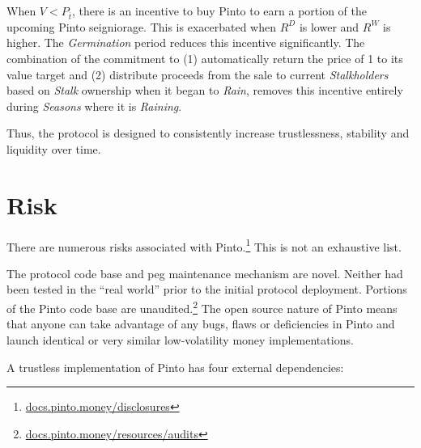 \documentclass[tikz]{article}
\newcommand{\term}[1]{\textsl{#1}}
\newcommand{\fref}[1]{\footnote{\href{http://#1}{#1}}}
\newcommand{\Pinto}{} %
\begin{document}
When $V < P_{\overline{t}}$, there is an incentive to buy Pinto to earn a portion of the upcoming Pinto seigniorage. This is exacerbated when $R^{D}$ is lower and $R^{W}$ is higher. The \term{Germination} period reduces this incentive significantly. The combination of the commitment to (1) automatically return the price of \Pinto1 to its value target and (2) distribute proceeds from the sale to current \term{Stalkholders} based on \term{Stalk} ownership when it began to \term{Rain}, removes this incentive entirely during \term{Seasons} where it is \term{Raining}.

\vspace{-0.15cm}

Thus, the protocol is designed to consistently increase trustlessness, stability and liquidity over time.


\vspace{-0.15cm}
\section{Risk}
\vspace{-0.15cm}

There are numerous risks associated with Pinto.\fref{docs.pinto.money/disclosures} This is not an exhaustive list.

\vspace{-0.15cm}

The protocol code base and peg maintenance mechanism are novel. Neither had been tested in the “real world” prior to the initial protocol deployment. Portions of the Pinto code base are unaudited.\footnote{\href{https://docs.pinto.money/resources/audits}{docs.pinto.money/resources/audits}} The open source nature of Pinto means that anyone can take advantage of any bugs, flaws or deficiencies in Pinto and launch identical or very similar low-volatility money implementations.

\vspace{-0.15cm}

A trustless implementation of Pinto has four external dependencies:
\end{document}
